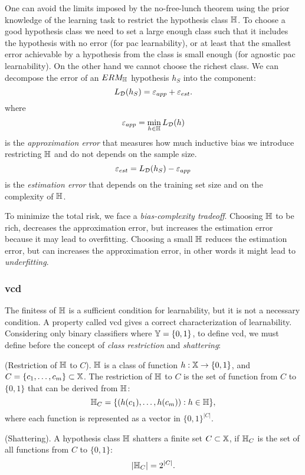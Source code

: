 One can avoid the limits imposed by the no-free-lunch theorem using
the prior knowledge of the learning task to restrict the hypothesis
class $\mathbb{H}$. To choose a good hypothesis class we need to set a
large enough class such that it includes the hypothesis with no error
(for \ac{pac} learnability), or at least that the smallest error
achievable by a hypothesis from the class is small enough (for
agnostic \ac{pac} learnability). On the other hand we cannot choose
the richest class. We can decompose the error of an $ERM_{\mathbb{H}}$
hypothesis $h_S$ into the component:
\begin{equation*}
  L_{\mathcal{D}}(h_S)=\varepsilon_{app}+\varepsilon_{est}.
\end{equation*}
where
\begin{equation*}
  \varepsilon_{app}=\min_{h\in\mathbb{H}}L_{\mathcal{D}}(h)
\end{equation*}
is the \emph{approximation error} that measures how much inductive
bias we 
introduce restricting $\mathbb{H}$ and do not depends on the sample size.
\begin{equation*}
  \varepsilon_{est}=L_{\mathcal{D}}(h_S)-\varepsilon_{app}
\end{equation*}
is the \emph{estimation error} that depends on the training set size
and on the complexity of $\mathbb{H}$.

To minimize the total risk, we face a \emph{bias-complexity
  tradeoff}. Choosing $\mathbb{H}$ to be rich, decreases the approximation
error, but increases the estimation error because it may lead to
overfitting. Choosing a small $\mathbb{H}$ reduces the estimation error,
but can increases the approximation error, in other words it might
lead to \emph{underfitting}.

\subsubsection{\ac{vcd}}
The finitess of $\mathbb{H}$ is a sufficient condition for learnability,
but it is not a necessary condition. A property called \ac{vcd} gives
a correct characterization of learnability. Considering only binary
classifiers where $\mathbb{Y}=\{0,1\}$, to define \ac{vcd}, we
must define before the concept of \emph{class restriction} and
\emph{shattering}:
\begin{definition}
  (Restriction of $\mathbb{H}$ to $C$). $\mathbb{H}$ is a class of function
  $h:\mathbb{X}\rightarrow\{0,1\}$, and
    $C=\{c_1,\dots,c_m\}\subset\mathbb{X}$. The restriction of $\mathbb{H}$ to
    $C$ is the set of function from $C$ to $\{0,1\}$ that can be
    derived from $\mathbb{H}$:
    \begin{equation*}
      \mathbb{H}_C=\{(h(c_1),\dots,h(c_m)):h\in\mathbb{H}\},
    \end{equation*}
    where each function is represented as a vector in
    $\{0,1\}^{|C|}$.
\end{definition}
\begin{definition}
  (Shattering). A hypothesis class $\mathbb{H}$ shatters a finite set
  $C\subset\mathbb{X}$, if $\mathbb{H}_C$ is the set of all functions from $C$
  to $\{0,1\}$:
  \begin{equation*}
    |\mathbb{H}_C|=2^{|C|}.
  \end{equation*}
\end{definition}

